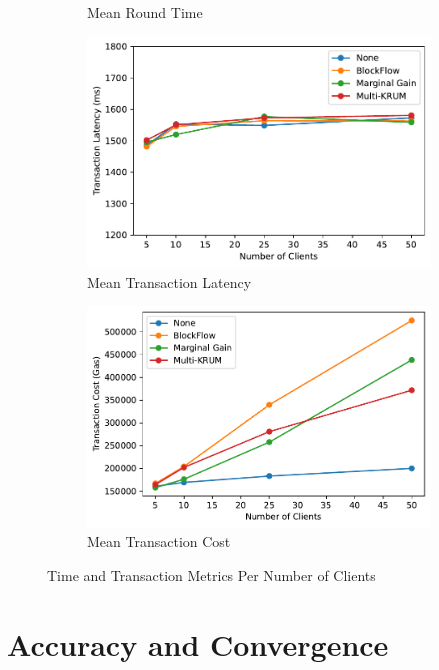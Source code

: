 \begin{figure}[!ht]
\begin{subfigure}[b]{0.49\textwidth}
        \caption{Mean Round Time}
    \end{subfigure}
    \hfill
    \begin{subfigure}[b]{0.49\textwidth}
        \centering
        \includegraphics[width=\textwidth]{graphics/clients/tx_latency.pdf}
        \caption{Mean Transaction Latency}
    \end{subfigure}
    \hfill
    \begin{subfigure}[b]{0.49\textwidth}
        \centering
        \includegraphics[width=\textwidth]{graphics/clients/tx_cost.pdf}
        \caption{Mean Transaction Cost}
    \end{subfigure}
    \caption{Time and Transaction Metrics Per Number of Clients}
    \label{fig:clients_metrics}
\end{figure}

\section{Accuracy and Convergence}


